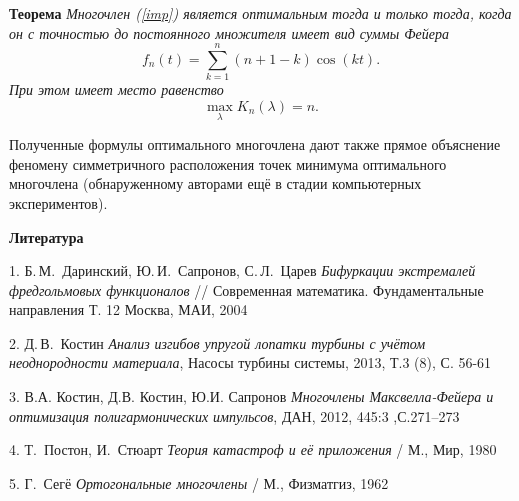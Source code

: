 {\bf Теорема} {\it
Многочлен (\ref{imp}) является оптимальным тогда и только тогда, когда он с точностью до постоянного множителя имеет вид суммы Фейера
$$
f_n(t)=\sum\limits_{k=1}^n (n+1-k) \cos(kt).
$$
При этом имеет место равенство
$$
\max\limits_{\lambda} K_n(\lambda) = n.
$$}

Полученные формулы оптимального многочлена дают также прямое
объяснение феномену симметричного расположения точек минимума
оптимального многочлена (обнаруженному авторами ещё в стадии
компьютерных экспериментов).



\smallskip \centerline{\bf Литература}\nopagebreak

1.  Б.\,М.~Даринский, Ю.\,И.~Сапронов, С.\,Л.~Царев {\it Бифуркации экстремалей фредгольмовых функционалов}
//
Современная
математика. Фундаментальные направления Т. 12 Москва, МАИ, 2004


2. Д.\,В.~Костин {\it Анализ изгибов упругой лопатки турбины с учётом
неоднородности материала},  Насосы турбины системы, 2013, Т.3 (8), С. 56-61

3. В.А. Костин, Д.В. Костин, Ю.И. Сапронов {\it Многочлены Максвелла-Фейера и оптимизация
полигармонических импульсов},  ДАН, 2012,  445:3 ,С.271--273

4. Т.~Постон, И.~Стюарт {\it Теория  катастроф  и  её  приложения} /  М., Мир, 1980

5. Г.~Сегё {\it Ортогональные многочлены} / М., Физматгиз, 1962
